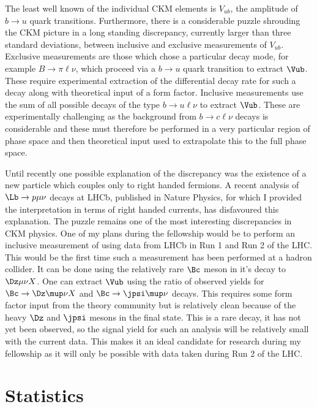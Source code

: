 \documentclass[a4paper, 10pt]{article}
\begin{document}
The least well known of the individual CKM elements is $V_{ub}$, the amplitude of $b\to u$ quark transitions. Furthermore, there is a considerable puzzle shrouding the CKM picture in a long standing discrepancy, currently larger than three standard deviations, between inclusive and exclusive measurements of 
$V_{ub}$. 
Exclusive measurements are those which chose a particular decay mode, for example $B\to\pi\ell\nu$, which proceed via a $b\to u$ quark transition to extract $\Vub$. These require experimental
extraction of the differential decay rate for such a decay along with theoretical input of a form factor. Inclusive measurements use the sum of all possible decays of the type $b \to u \ell\nu$ to extract $\Vub$. These are 
experimentally challenging as the background from $b \to c\ell\nu$ decays is considerable and these must therefore be performed in a very particular region of phase space and then theoretical input 
used to extrapolate this to the full phase space. 

Until recently one possible explanation of the discrepancy was the existence of a new particle which couples only to right handed fermions. A recent analysis of $\Lb\to p\mu\nu$ decays at LHCb, published in Nature Physics, for which I provided the interpretation in terms of right handed currents, has 
disfavoured this explanation.
The \Vub puzzle remains one of the most interesting discrepancies in CKM physics. One of my plans during the fellowship would be to perform an inclusive measurement of \Vub using data from LHCb in Run 1 and Run 2 of the LHC. This would be the first time such a measurement has been performed at a hadron collider.
It can be done using the relatively rare $\Bc$ meson in it's decay to $\Dz\mu\nu X$. One can extract $\Vub$ using the ratio of observed yields for $\Bc\to\Dz\mup\nu X$ and $\Bc\to\jpsi\mup\nu$ decays. This requires
some form factor input from the theory community but is relatively clean because of the heavy $\Dz$ and $\jpsi$ mesons in the final state.
This is a rare decay, it has not yet been observed, so the signal yield for such an analysis will be relatively small with the current data. This makes it an ideal candidate for research during my fellowship as it will only be possible with data taken during Run 2 of the LHC.

\section*{Statistics}
\end{document}

